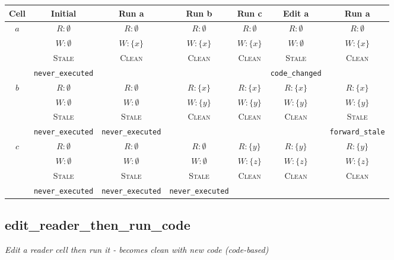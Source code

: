 \documentclass{article}
\begin{document}
\begin{center}
\small
\begin{tabular}{|c|c|c|c|c|c|c|}
\hline
\textbf{Cell} & \textbf{Initial} & \textbf{Run a} & \textbf{Run b} & \textbf{Run c} & \textbf{Edit a} & \textbf{Run a} \\
\hline
\multirow{4}{*}{$a$}
  & $R: \emptyset$ & $R: \emptyset$ & $R: \emptyset$ & $R: \emptyset$ & $R: \emptyset$ & $R: \emptyset$ \\
  & $W: \emptyset$ & $W: \{x\}$ & $W: \{x\}$ & $W: \{x\}$ & $W: \emptyset$ & $W: \{x\}$ \\
  & \textsc{Stale} & \textsc{Clean} & \textsc{Clean} & \textsc{Clean} & \textsc{Stale} & \textsc{Clean} \\
  & \footnotesize\texttt{never\_executed} &  &  &  & \footnotesize\texttt{code\_changed} &  \\
\hline
\multirow{4}{*}{$b$}
  & $R: \emptyset$ & $R: \emptyset$ & $R: \{x\}$ & $R: \{x\}$ & $R: \{x\}$ & $R: \{x\}$ \\
  & $W: \emptyset$ & $W: \emptyset$ & $W: \{y\}$ & $W: \{y\}$ & $W: \{y\}$ & $W: \{y\}$ \\
  & \textsc{Stale} & \textsc{Stale} & \textsc{Clean} & \textsc{Clean} & \textsc{Clean} & \textsc{Stale} \\
  & \footnotesize\texttt{never\_executed} & \footnotesize\texttt{never\_executed} &  &  &  & \footnotesize\texttt{forward\_stale} \\
\hline
\multirow{4}{*}{$c$}
  & $R: \emptyset$ & $R: \emptyset$ & $R: \emptyset$ & $R: \{y\}$ & $R: \{y\}$ & $R: \{y\}$ \\
  & $W: \emptyset$ & $W: \emptyset$ & $W: \emptyset$ & $W: \{z\}$ & $W: \{z\}$ & $W: \{z\}$ \\
  & \textsc{Stale} & \textsc{Stale} & \textsc{Stale} & \textsc{Clean} & \textsc{Clean} & \textsc{Clean} \\
  & \footnotesize\texttt{never\_executed} & \footnotesize\texttt{never\_executed} & \footnotesize\texttt{never\_executed} &  &  &  \\
\hline
\end{tabular}
\end{center}


\subsection{edit\_reader\_then\_run\_code}
\textit{Edit a reader cell then run it - becomes clean with new code (code-based)}
\end{document}
